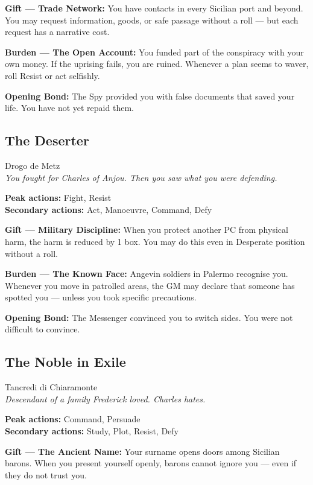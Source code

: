 \textbf{Gift --- Trade Network:} You have contacts in every Sicilian
port and beyond. You may request information, goods, or safe passage
without a roll — but each request has a narrative cost.

\textbf{Burden --- The Open Account:} You funded part of the conspiracy
with your own money. If the uprising fails, you are ruined. Whenever
a plan seems to waver, roll Resist or act selfishly.

\textbf{Opening Bond:} The Spy provided you with false documents that
saved your life. You have not yet repaid them.

\filetto

\subsection{The Deserter}
{\cinzel\footnotesize\color{grigionote} Drogo de Metz}\\
\textit{You fought for Charles of Anjou. Then you saw what you were defending.}

\textbf{Peak actions:} Fight, Resist\\
\textbf{Secondary actions:} Act, Manoeuvre, Command, Defy

\textbf{Gift --- Military Discipline:} When you protect another PC from
physical harm, the harm is reduced by 1 box. You may do this even in
Desperate position without a roll.

\textbf{Burden --- The Known Face:} Angevin soldiers in Palermo
recognise you. Whenever you move in patrolled areas, the GM may declare
that someone has spotted you — unless you took specific precautions.

\textbf{Opening Bond:} The Messenger convinced you to switch sides.
You were not difficult to convince.

\filetto

\subsection{The Noble in Exile}
{\cinzel\footnotesize\color{grigionote} Tancredi di Chiaramonte}\\
\textit{Descendant of a family Frederick loved. Charles hates.}

\textbf{Peak actions:} Command, Persuade\\
\textbf{Secondary actions:} Study, Plot, Resist, Defy

\textbf{Gift --- The Ancient Name:} Your surname opens doors among
Sicilian barons. When you present yourself openly, barons cannot
ignore you — even if they do not trust you.

